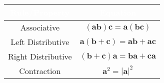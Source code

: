 \documentclass{article}
\newcommand{\head}[1]{\textnormal{\textbf{#1}}}
\begin{document}
	{	
	\begin{table}[!h]
		\begin{tabular}{||c|c||}
			\hline
			\rowcolor{green!50!blue} \textcolor{white}{\head{Rule/Property}} & \textcolor{white}{\head{Equation}}\\ 
			\hline
			Associative & $(\mathbf{ab})\mathbf{c} = \mathbf{a}(\mathbf{bc})$ \\
			Left Distributive & $\mathbf{a}(\mathbf{b}+\mathbf{c}) = \mathbf{ab}+\mathbf{ac}$ \\
			Right Distributive & $(\mathbf{b}+\mathbf{c})\mathbf{a} = \mathbf{ba}+\mathbf{ca}$ \\
			Contraction & $\mathbf{a}^2 = |\mathbf{a}|^2$ \\
			\hline
		\end{tabular}
	\end{table}}
\end{document}
